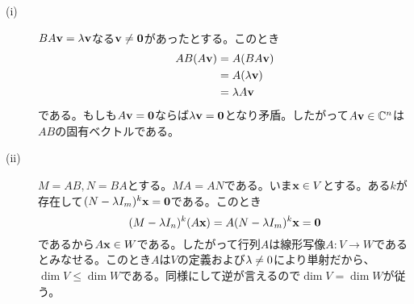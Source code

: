 \subsubsection{} %
\begin{sol} ${}$
  \begin{description}
    \item[(i)] $BA \textbf{v} = {\lambda} \textbf{v}$なる$\textbf{v} \neq \textbf{0}$があったとする。このとき
    \begin{align*}
      AB(A \textbf{v}) &= A(BA \textbf{v}) \\
      &= A ({\lambda} \textbf{v}) \\
      &= {\lambda} A \textbf{v}
    \end{align*}
    である。もしも$A \textbf{v} = \textbf{0}$ならば${\lambda} \textbf{v} = \textbf{0}$となり矛盾。したがって$A \textbf{v} \in {\mathbb C}^n$は$AB$の固有ベクトルである。
    \item[(ii)] $M = AB, N = BA$とする。$MA = AN$である。いま$\textbf{x} \in V$とする。ある$k$が存在して$(N - {\lambda} I_m)^k \textbf{x} = \textbf{0}$である。このとき
    \[
(M - {\lambda} I_n)^k (A \textbf{x}) = A  (N - {\lambda} I_m)^k \textbf{x} = \textbf{0}
    \]
    であるから$A \textbf{x} \in W$である。したがって行列$A$は線形写像$A \colon V \to W$であるとみなせる。このとき$A$は$V$の定義および${\lambda} \neq 0$により単射だから、$\dim V \leq \dim W$である。同様にして逆が言えるので$\dim V = \dim W$が従う。
  \end{description}
\end{sol}

\newpage


